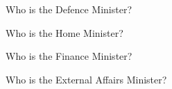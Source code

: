 \begin{question}
  Who is the Defence Minister?
\end{question}
\begin{question}
  Who is the Home Minister?
\end{question}
\begin{question}
  Who is the Finance Minister?
\end{question}
\begin{question}
  Who is the External Affairs Minister?
\end{question}
